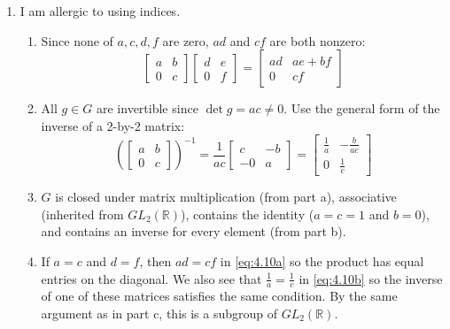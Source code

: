 \documentclass[]{article}
\newcommand{\bbr}{\mathbb{R}}
\begin{document}
\begin{enumerate}
\item I am allergic to using indices.
\begin{enumerate}
\item Since none of $a,c,d,f$ are zero, $ad$ and $cf$ are both nonzero:
\begin{equation}
\begin{bmatrix}a&b\\0&c\end{bmatrix}\begin{bmatrix}d&e\\0&f\end{bmatrix} = \begin{bmatrix}ad&ae+bf\\0&cf\end{bmatrix} \label{eq:4.10a}
\end{equation}

\item All $g \in G$ are invertible since $\det g = ac \neq 0$. Use the general form of the inverse of a 2-by-2 matrix:
\begin{equation}
\left( \begin{bmatrix}a&b\\0&c\end{bmatrix} \right)^{-1} = \frac{1}{ac}\begin{bmatrix}c&-b\\-0&a\end{bmatrix} = \begin{bmatrix}\frac{1}{a}&-\frac{b}{ac}\\0&\frac{1}{c}\end{bmatrix} \label{eq:4.10b}
\end{equation}

\item $G$ is closed under matrix multiplication (from part a), associative (inherited from $GL_2(\bbr)$), contains the identity ($a=c=1$ and $b=0$), and contains an inverse for every element (from part b).
\item If $a=c$ and $d=f$, then $ad = cf$ in \eqref{eq:4.10a} so the product has equal entries on the diagonal. We also see that $\frac{1}{a} = \frac{1}{c}$ in \eqref{eq:4.10b} so the inverse of one of these matrices satisfies the same condition. By the same argument as in part c, this is a subgroup of $GL_2(\bbr)$.
\end{enumerate}



\end{enumerate}
\end{document}
